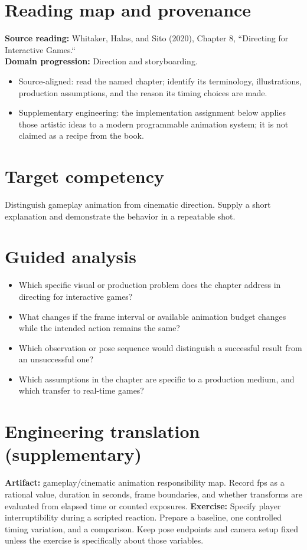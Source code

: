 \documentclass[10pt,letterpaper]{article}
\begin{document}
\makedoctitle
\makedocsummary

\section{Reading map and provenance}
\textbf{Source reading:} Whitaker, Halas, and Sito (2020), Chapter 8, ``Directing for Interactive Games.``\\
\textbf{Domain progression:} Direction and storyboarding.
\begin{itemize}
\item Source-aligned: read the named chapter; identify its terminology, illustrations, production assumptions, and the reason its timing choices are made.
\item Supplementary engineering: the implementation assignment below applies those artistic ideas to a modern programmable animation system; it is not claimed as a recipe from the book.
\end{itemize}
\section{Target competency}
Distinguish gameplay animation from cinematic direction. Supply a short explanation and demonstrate the behavior in a repeatable shot.
\section{Guided analysis}
\begin{itemize}
\item Which specific visual or production problem does the chapter address in directing for interactive games?
\item What changes if the frame interval or available animation budget changes while the intended action remains the same?
\item Which observation or pose sequence would distinguish a successful result from an unsuccessful one?
\item Which assumptions in the chapter are specific to a production medium, and which transfer to real-time games?
\end{itemize}
\section{Engineering translation (supplementary)}
\textbf{Artifact:} gameplay/cinematic animation responsibility map. Record fps as a rational value, duration in seconds, frame boundaries, and whether transforms are evaluated from elapsed time or counted exposures.
\textbf{Exercise:} Specify player interruptibility during a scripted reaction. Prepare a baseline, one controlled timing variation, and a comparison. Keep pose endpoints and camera setup fixed unless the exercise is specifically about those variables.
\end{document}
